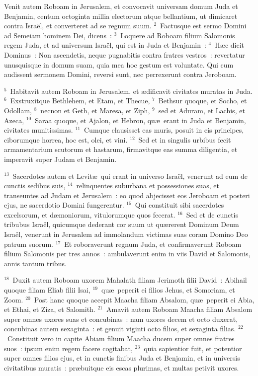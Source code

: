 \lettrine[lines=10,image=true,loversize=0.05,lraise=-0.03]{V}{}enit autem Roboam in Jerusalem, et convocavit universam domum Juda et Benjamin, centum octoginta millia electorum atque bellantium, ut dimicaret contra Isra\"el, et converteret ad se regnum suum.
${}^{2}$~Factusque est sermo Domini ad Semeiam hominem Dei, dicens~:
${}^{3}$~Loquere ad Roboam filium Salomonis regem Juda, et ad universum Isra\"el, qui est in Juda et Benjamin~:
${}^{4}$~H\ae c dicit Dominus~: Non ascendetis, neque pugnabitis contra fratres vestros~: revertatur unusquisque in domum suam, quia mea hoc gestum est voluntate. Qui cum audissent sermonem Domini, reversi sunt, nec perrexerunt contra Jeroboam.


${}^{5}$~Habitavit autem Roboam in Jerusalem, et \ae dificavit civitates muratas in Juda.
${}^{6}$~Exstruxitque Bethlehem, et Etam, et Thecue,
${}^{7}$~Bethsur quoque, et Socho, et Odollam,
${}^{8}$~necnon et Geth, et Maresa, et Ziph,
${}^{9}$~sed et Aduram, et Lachis, et Azeca,
${}^{10}$~Saraa quoque, et Ajalon, et Hebron, qu\ae\ erant in Juda et Benjamin, civitates munitissimas.
${}^{11}$~Cumque clausisset eas muris, posuit in eis principes, ciborumque horrea, hoc est, olei, et vini.
${}^{12}$~Sed et in singulis urbibus fecit armamentarium scutorum et hastarum, firmavitque eas summa diligentia, et imperavit super Judam et Benjamin.


${}^{13}$~Sacerdotes autem et Levit\ae\ qui erant in universo Isra\"el, venerunt ad eum de cunctis sedibus suis,
${}^{14}$~relinquentes suburbana et possessiones suas, et transeuntes ad Judam et Jerusalem~: eo quod abjecisset eos Jeroboam et posteri ejus, ne sacerdotio Domini fungerentur.
${}^{15}$~Qui constituit sibi sacerdotes excelsorum, et d\ae moniorum, vitulorumque quos fecerat.
${}^{16}$~Sed et de cunctis tribubus Isra\"el, quicumque dederant cor suum ut qu\ae rerent Dominum Deum Isra\"el, venerunt in Jerusalem ad immolandum victimas suas coram Domino Deo patrum suorum.
${}^{17}$~Et roboraverunt regnum Juda, et confirmaverunt Roboam filium Salomonis per tres annos~: ambulaverunt enim in viis David et Salomonis, annis tantum tribus.


${}^{18}$~Duxit autem Roboam uxorem Mahalath filiam Jerimoth filii David~: Abihail quoque filiam Eliab filii Isai,
${}^{19}$~qu\ae\ peperit ei filios Jehus, et Somoriam, et Zoom.
${}^{20}$~Post hanc quoque accepit Maacha filiam Absalom, qu\ae\ peperit ei Abia, et Ethai, et Ziza, et Salomith.
${}^{21}$~Amavit autem Roboam Maacha filiam Absalom super omnes uxores suas et concubinas~: nam uxores decem et octo duxerat, concubinas autem sexaginta~: et genuit viginti octo filios, et sexaginta filias.
${}^{22}$~Constituit vero in capite Abiam filium Maacha ducem super omnes fratres suos~: ipsum enim regem facere cogitabat,
${}^{23}$~quia sapientior fuit, et potentior super omnes filios ejus, et in cunctis finibus Juda et Benjamin, et in universis civitatibus muratis~: pr\ae buitque eis escas plurimas, et multas petivit uxores.

